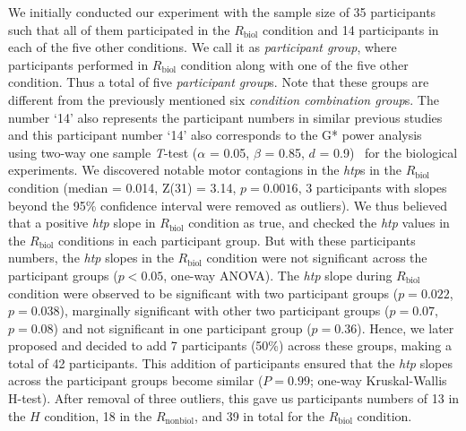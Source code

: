 We initially conducted our experiment with the sample size of 35 participants such that all of them participated in the $R_{\text{biol}}$ condition and 14 participants in each of the five other conditions. We call it as \textit{participant group}, where participants performed in $R_{\text{biol}}$ condition along with one of the five other condition. Thus a total of five \textit{participant group}s. Note that these groups are different from the previously mentioned six \emph{condition combination group}s. The number `14' also represents the participant numbers in similar previous studies~\cite{Bisio:PlosOne:2010, Bisio:PlosOne:2014} and this participant number `14' also corresponds to the G* power analysis~\cite{Erdfelder:JBRMIC:1996} using two-way one sample {\it T}-test ($\alpha$ = 0.05, $\beta$ = 0.85, $d$ = 0.9)~\cite{Verma:power_analysis:2017} for the biological experiments. We discovered notable motor contagions in the {\it htp}s in the $R_{\text{biol}}$ condition (median = 0.014, Z(31) = 3.14, $p = 0.0016$, 3 participants with slopes beyond the 95\% confidence interval were removed as outliers). We thus believed that a positive {\it htp} slope in $R_{\text{biol}}$ condition as true, and checked the {\it htp} values in the $R_{\text{biol}}$ conditions in each participant group. But with these participants numbers, the {\it htp} slopes in the $R_{\text{biol}}$ condition were not significant across the participant groups ($p<0.05$, one-way ANOVA). The {\it htp} slope during $R_{\text{biol}}$ condition were observed to be significant with two participant groups ($p = 0.022$, $p = 0.038$), marginally significant with other two participant groups ($p = 0.07$, $p = 0.08$) and not significant in one participant group ($p = 0.36$). Hence, we later proposed and decided to add 7 participants (50\%) across these groups, making a total of 42 participants. This addition of participants ensured that the {\it htp} slopes across the participant groups become similar ($P = 0.99$; one-way Kruskal-Wallis H-test). After removal of three outliers, this gave us participants numbers of 13 in the $H$ condition, 18 in the $R_{\text{nonbiol}}$, and 39 in total for the $R_{\text{biol}}$ condition.


